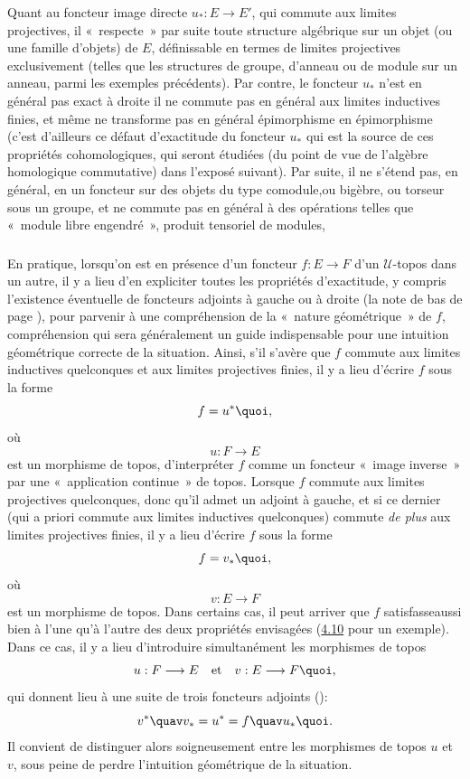 \documentclass[10pt]{../fichiers-configuration-latex/smfart}
\begin{document}
Quant au foncteur image directe $u_{\ast}:E\rightarrow E'$, qui
commute aux limites projectives, il « respecte »  par suite
toute structure algébrique sur un objet (ou une famille d'objets)
de $E$, définissable en termes de limites projectives
exclusivement (telles que les structures de groupe, d'anneau ou de
module sur un anneau, parmi les exemples précédents). Par
contre, le foncteur $u_{\ast}$ n'est en général pas exact à
droite \ie il ne commute pas en général aux limites inductives
finies, et même ne transforme pas en général épimorphisme en
épimorphisme (c'est d'ailleurs ce défaut d'exactitude du
foncteur $u_{\ast}$ qui est la source de ces propriétés
cohomologiques, qui seront étudiées (du point de vue de
l'algèbre homologique commutative) dans l'exposé suivant). Par
suite, il ne s'étend pas, en général, en un foncteur sur des
objets du type comodule,\pageoriginale ou bigèbre, ou torseur sous
un groupe, et ne commute pas en général à des opérations
telles que « module libre engendré », produit tensoriel de
modules, \etc

\subsubsection{}
En pratique, lorsqu'on est en présence d'un foncteur
$f:E\rightarrow F$ d'un $𝒰$-topos dans un autre, il y a lieu
d'en expliciter toutes les propriétés d'exactitude, y compris
l'existence éventuelle de foncteurs adjoints à gauche ou à
droite (\cf la note de bas de page \pageref{sga4[1]}), pour parvenir
à une compréhension de la « nature géométrique »  de
$f$, compréhension qui sera généralement un guide
indispensable pour une intuition géométrique correcte de la
situation. Ainsi, s'il s'avère que $f$ commute aux limites
inductives quelconques et aux limites projectives finies, il y a
lieu d'écrire $f$ sous la forme
$$
f=u^{\ast}{\quoi},
$$
où
$$
u:F\longrightarrow E
$$
est un morphisme de topos, \ie d'interpréter $f$ comme un foncteur
« image inverse »  par une « application continue »  de
topos. Lorsque $f$ commute aux limites projectives quelconques, donc
qu'il admet un adjoint à gauche, et si ce dernier (qui a priori
commute aux limites inductives quelconques) commute \emph{de plus}
aux limites projectives finies, il y a lieu d'écrire $f$ sous la
forme
$$
f=v_{\ast}{\quoi},
$$
où
$$
v:E\longrightarrow F
$$
est un morphisme de topos. Dans certains cas, il peut arriver que
$f$ satisfasse\pageoriginale aussi bien à l'une qu'à l'autre des
deux propriétés envisagées (\cf \hyperref[IV.subsec4.10]{4.10} pour un
exemple). Dans ce cas, il y a lieu  d'introduire simultanément les
morphismes de topos
$$
u:F\longrightarrow E \quad\text{et}\quad v:E\longrightarrow F{\quoi},
$$
qui donnent lieu à une suite de trois foncteurs adjoints
():
$$
v^{\ast} \quav v_{\ast}=u^{\ast}=f\quav u_{\ast}{\quoi}.
$$
Il convient de distinguer alors soigneusement entre les morphismes
de topos $u$ et $v$, sous peine de perdre l'intuition
géométrique de la situation.
\end{document}
